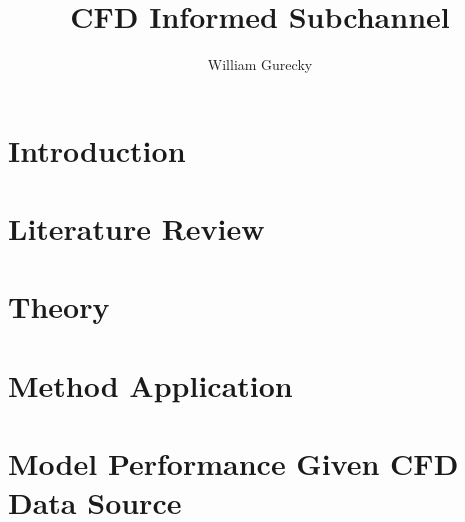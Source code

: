 \documentclass[12pt,a4paper]{report}
\author{William Gurecky}
\title{CFD Informed Subchannel}
\begin{document}








\onehalfspacing
\chapter{Introduction}
\label{chap:intro}


\chapter{Literature Review}
\label{chap:lit}


\chapter{Theory}
\label{chap:theory}


\chapter{Method Application}
\label{chap:work}


\chapter{Model Performance Given CFD Data Source}
\label{chap:fw}



\end{document}
